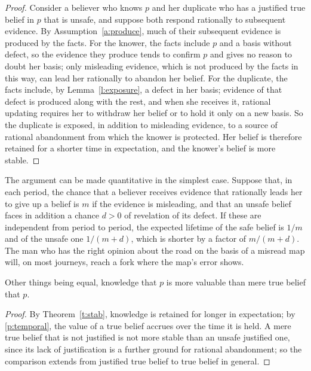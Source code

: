 \documentclass{situationist-preprint}
\begin{document}
\begin{proof}
Consider a believer who knows $p$ and her duplicate who has a justified true belief in $p$ that is unsafe, and suppose both respond rationally to subsequent evidence. By Assumption~\ref{a:produce}, much of their subsequent evidence is produced by the facts. For the knower, the facts include $p$ and a basis without defect, so the evidence they produce tends to confirm $p$ and gives no reason to doubt her basis; only misleading evidence, which is not produced by the facts in this way, can lead her rationally to abandon her belief. For the duplicate, the facts include, by Lemma~\ref{l:exposure}, a defect in her basis; evidence of that defect is produced along with the rest, and when she receives it, rational updating requires her to withdraw her belief or to hold it only on a new basis. So the duplicate is exposed, in addition to misleading evidence, to a source of rational abandonment from which the knower is protected. Her belief is therefore retained for a shorter time in expectation, and the knower's belief is more stable.
\end{proof}

The argument can be made quantitative in the simplest case. Suppose that, in each period, the chance that a believer receives evidence that rationally leads her to give up a belief is $m$ if the evidence is misleading, and that an unsafe belief faces in addition a chance $d > 0$ of revelation of its defect. If these are independent from period to period, the expected lifetime of the safe belief is $1/m$ and of the unsafe one $1/(m + d)$, which is shorter by a factor of $m/(m + d)$. The man who has the right opinion about the road on the basis of a misread map will, on most journeys, reach a fork where the map's error shows.

\begin{corollary}[Value]\label{c:value}
Other things being equal, knowledge that $p$ is more valuable than mere true belief that $p$.
\end{corollary}

\begin{proof}
By Theorem~\ref{t:stab}, knowledge is retained for longer in expectation; by \ref{p:temporal}, the value of a true belief accrues over the time it is held. A mere true belief that is not justified is not more stable than an unsafe justified one, since its lack of justification is a further ground for rational abandonment; so the comparison extends from justified true belief to true belief in general.
\end{proof}
\end{document}
